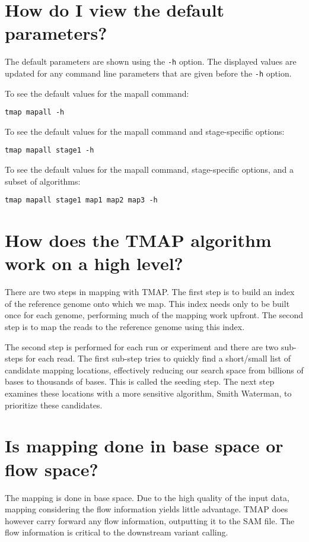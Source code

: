 \documentclass[a4paper,12pt]{book}
\newcommand{\TT}[1]{{\tt #1}} %
\begin{document}
\section{How do I view the default parameters?}

The default parameters are shown using the \TT{-h} option.
The displayed values are updated for any command line parameters that are given before the \TT{-h} option.

To see the default values for the mapall command:
\begin{verbatim}
tmap mapall -h
\end{verbatim}

To see the default values for the mapall command and stage-specific options:
\begin{verbatim}
tmap mapall stage1 -h
\end{verbatim}

To see the default values for the mapall command, stage-specific options, and a subset of algorithms:
\begin{verbatim}
tmap mapall stage1 map1 map2 map3 -h
\end{verbatim}

\section{How does the TMAP algorithm work on a high level?}

There are two steps in mapping with TMAP.
The first step is to build an index of the reference genome onto which we map.
This index needs only to be built once for each genome, performing much of the mapping work upfront.
The second step is to map the reads to the reference genome using this index.
	
The second step is performed for each run or experiment and there are two sub-steps for each read. 
The first sub-step tries to quickly find a short/small list of candidate mapping locations, effectively reducing our search space from billions of bases to thousands of bases.  
This is called the seeding step.  
The next step examines these locations with a more sensitive algorithm, Smith Waterman, to prioritize these candidates.

\section{Is mapping done in base space or flow space?}

The mapping is done in base space.  
Due to the high quality of the input data, mapping considering the flow information yields little advantage.  
TMAP does however carry forward any flow information, outputting it to the SAM file.  The flow information is critical to the downstream variant calling.
\end{document}

